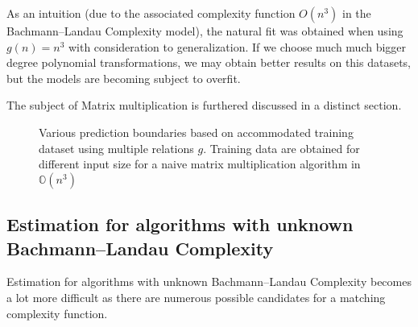 As an intuition (due to the associated complexity function $O(n^3)$ in the Bachmann–Landau Complexity model), the natural fit was obtained when using $g(n) = n^3$ with consideration to generalization. If we choose much much bigger degree polynomial transformations, we may obtain better results on this datasets, but the models are becoming subject to overfit.

The subject of Matrix multiplication is furthered discussed in a distinct section.

\begin{figure}[H]
    \caption{Various prediction boundaries based on accommodated training dataset using multiple relations $g$. Training data are obtained for different input size for a naive matrix multiplication algorithm in $\mathbb{O}(n^{3})$}
\end{figure}

\subsection{Estimation for algorithms with unknown Bachmann–Landau Complexity}
Estimation for algorithms with unknown Bachmann–Landau Complexity becomes a lot more difficult as there are numerous possible candidates for a matching complexity function.

